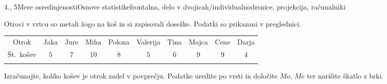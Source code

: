 \begin{priprava}{4., 5}{}{Mere osredinjenosti}{Osnove statistike}{frontalna, delo v dvojicah/individualno}{drsnice, projekcija, računalniki}
    \begin{naloga}
     
     Otroci v vrtcu so metali žogo na koš in si zapisovali dosežke. Podatki so prikazani v preglednici. 

         \begin{table}[H]
             \centering
             \begin{tabular}{||c|c|c|c|c|c|c|c|c|c||} 
             \hhline{|t:==========:t|}
             \rowcolor[rgb]{0.843,0.718,0.718} 
             Otrok  & Jaka & Jure & Miha & Polona & Valerija & Tina & Mojca & Cene & Darja   \\ 
             \hhline{|:==========:|}
             Št.~košev & $5$ & $7$ & $10$ & $8$ & $5$ & $6$ & $9$ & $9$& $4$  \\ 
             \hhline{|b:==========:b|}
             \end{tabular}
         \end{table}

        Izračunajte, koliko košev je otrok zadel v povprečju. Podatke uredite po vrsti in določite $Mo$, $Me$ ter narišite škatlo z brki.

    \end{naloga}



\end{priprava}